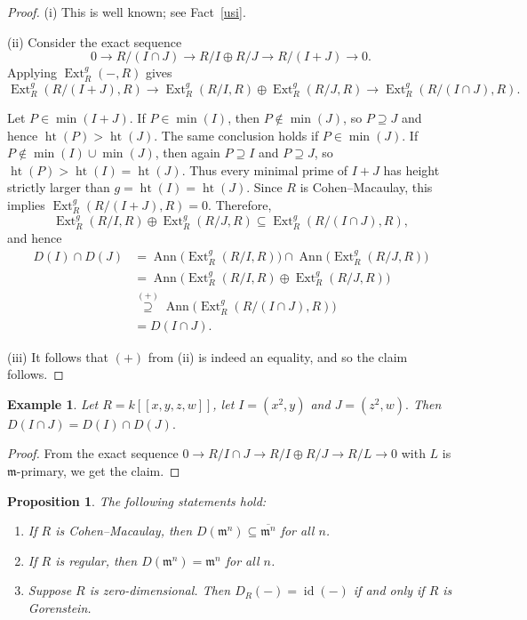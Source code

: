 \documentclass[11pt,a4paper]{amsart}
\numberwithin{equation}{section}
\newtheorem{proposition}[theorem]{Proposition}
\newtheorem{example}[theorem]{Example}
\DeclareMathOperator{\Ann}{Ann}\DeclareMathOperator{\ann}{Ann}
\DeclareMathOperator{\Ht}{ht}
\DeclareMathOperator{\Ext}{Ext}
\DeclareMathOperator{\id}{id}
\newcommand{\fm}{\mathfrak{m}}
\begin{document}
\begin{proof}
	(i) This is well known; see Fact~\ref{usi}.
	
	(ii) Consider the exact sequence
	\[
	0 \to R/(I \cap J) \to R/I \oplus R/J \to R/(I + J) \to 0.
	\]
	Applying $\Ext^g_R(-,R)$ gives
	\[
	\Ext^g_R(R/(I + J), R) \to \Ext^g_R(R/I, R) \oplus \Ext^g_R(R/J, R) \to \Ext^g_R(R/(I \cap J), R).
	\]
	
	Let $P \in \min(I+J)$. If $P \in \min(I)$, then $P \notin \min(J)$, so $P \supseteq J$ and hence $\Ht(P) > \Ht(J)$. The same conclusion holds if $P \in \min(J)$. If $P \notin \min(I) \cup \min(J)$, then again $P \supseteq I$ and $P \supseteq J$, so $\Ht(P) > \Ht(I)=\Ht(J)$. Thus every minimal prime of $I+J$ has height strictly larger than $g=\Ht(I)=\Ht(J)$. Since $R$ is Cohen--Macaulay, this implies
	\(
	\Ext^g_R(R/(I+J),R)=0.
	\) Therefore,
	\[
	\Ext^g_R(R/I,R)\oplus \Ext^g_R(R/J,R)
	\subseteq \Ext^g_R(R/(I\cap J),R),
	\]
	and hence
	\[
	\begin{aligned}
	D(I)\cap D(J)
	&= \Ann\!\big(\Ext^g_R(R/I,R)\big)\cap \Ann\!\big(\Ext^g_R(R/J,R)\big) \\
	&= \Ann\!\big(\Ext^g_R(R/I,R)\oplus \Ext^g_R(R/J,R)\big) \\
	&\stackrel{(+)}\supseteq \Ann\!\big(\Ext^g_R(R/(I\cap J),R)\big) \\
	&= D(I\cap J).
	\end{aligned}
	\]
	
	(iii) It follows that $(+)$ from (ii) is indeed an equality, and so the claim follows.
\end{proof}

 
\begin{example}\label{ex:planes}
	Let \(R = k[[x,y,z,w]]\),  let
	\(
	I = (x^2,y)\) and \(J = (z^2,w).
	\)
	Then
\(
D(I \cap J ) = D(I) \cap D(J ).
\)
\end{example}
	
	\begin{proof}
 From the exact sequence \(0 \to R/I \cap J \to R/I \oplus R/J \to R/L \to 0\) with $L$ is $\fm$-primary, we get
		 the  claim.
	\end{proof}
	



\begin{proposition}\label{d}
	The following statements hold:
	\begin{enumerate}
		\item[(i)] If $R$ is Cohen--Macaulay, then $D(\fm^n)\subseteq\overline{\fm^n}$ for all $n$.
		\item[(ii)] If $R$ is regular, then $D(\fm^n)=\fm^n$ for all $n$.
		\item[(iii)] Suppose $R$ is zero-dimensional. Then $D_R(-)=\id(-)$ if and only if $R$ is Gorenstein.
	\end{enumerate}
\end{proposition}
\end{document}
